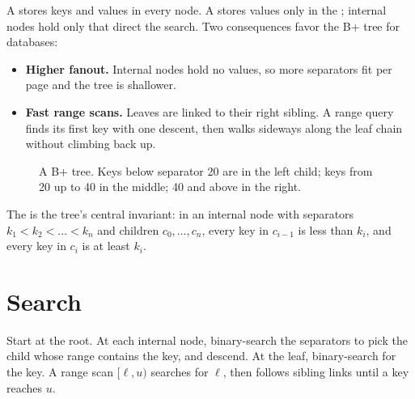 A  stores keys and values in every node. A  stores
values only in the ; internal nodes hold only 
that direct the search. Two consequences favor the B+ tree for databases:

\begin{itemize}
\item \textbf{Higher fanout.} Internal nodes hold no values, so more separators fit per page and the tree is shallower.
\item \textbf{Fast range scans.} Leaves are linked to their right sibling. A range query finds its first key with one descent, then walks sideways along the leaf chain without climbing back up.
\end{itemize}

\begin{figure}[ht]
\centering
{}
\caption{A B+ tree. Keys below separator 20 are in the left child; keys from 20 up to 40 in the middle; 40 and above in the right.}
\label{fig:bptree}
\end{figure}

The  is the tree's central invariant: in an internal node
with separators $k_1 < k_2 < \dots < k_n$ and children $c_0, \dots, c_n$, every
key in $c_{i-1}$ is less than $k_i$, and every key in $c_i$ is at least $k_i$.

\section{Search}

Start at the root. At each internal node, binary-search the separators to pick
the child whose range contains the key, and descend. At the leaf, binary-search
for the key. A range scan $[\ell, u)$ searches for $\ell$, then follows sibling
links until a key reaches $u$.

